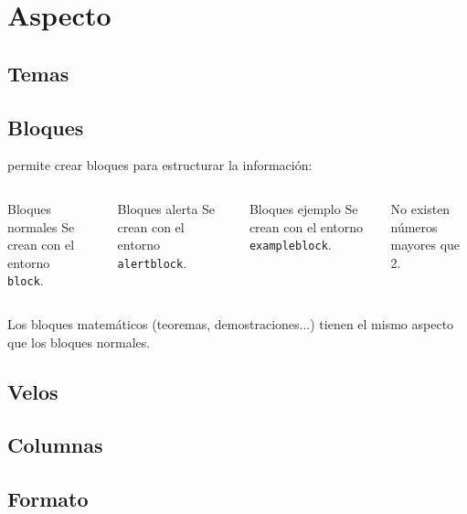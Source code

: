\section{Aspecto}

\subsection{Temas}

\subsection{Bloques}

\begin{frame}
  \beamer permite crear bloques para estructurar la información:
  \espacio
  \begin{columns}
      \pauses
      \begin{block}{Bloques normales}
        Se crean con el entorno \\ \texttt{block}.
      \end{block}

      \pause
      \begin{alertblock}{Bloques alerta}
        Se crean con el entorno \texttt{alertblock}.
      \end{alertblock}
    \pause
    \begin{exampleblock}{Bloques ejemplo}
      Se crean con el entorno \texttt{exampleblock}.
    \end{exampleblock}

    \pause
    \begin{theorem}
      No existen números mayores que 2.
    \end{theorem}
  \end{columns}

  \pause
  \espacio
  Los bloques matemáticos (teoremas, demostraciones...) tienen el mismo aspecto
  que los bloques normales.
\end{frame}

\subsection{Velos} %
\subsection{Columnas} %

\subsection{Formato}

